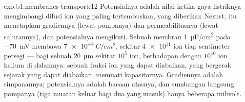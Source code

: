 \begin{solution}{exo:b1:membranes-transport:12}
Potensialnya adalah nilai ketika gaya listriknya mengimbangi difusi ion
yang paling tertembuskan, yang diberikan Nernst;  itu menetapkan
gradiennya (lewat pompanya) dan permeabilitasnya (lewat salurannya), dan
potensialnya mengikuti. Sebuah membran \qty{1}{\micro F/cm^2} pada
\qty{-70}{mV} membawa $\qty{7e-8}{C/cm^2}$, sekitar $\num{4e11}$ ion
tiap sentimeter persegi --- bagi sebuah  \qty{20}{\micro m} sekitar
$10^5$ ion, berhadapan dengan $10^{10}$ ion kalium di dalamnya: sebuah
fraksi ion yang dapat diabaikan, yang bergerak sejarak yang dapat
diabaikan, memuati kapasitornya. Gradiennya adalah simpanannya;
potensialnya adalah bacaan atasnya, dan sumbangan langsung pompanya
(tiga muatan keluar bagi dua yang masuk) hanya beberapa milivolt.
\end{solution}

